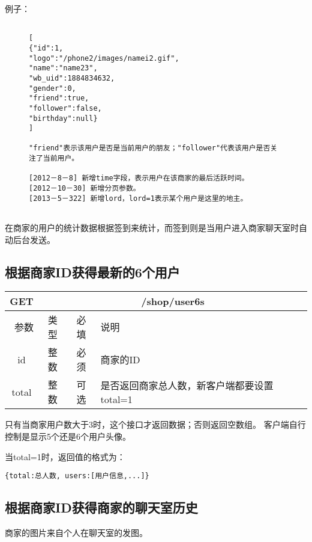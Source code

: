 \documentclass[cs4size]{ctexartutf8}
\begin{document}
例子：

\begin{figure}[H]
\begin{verbatim}

[
{"id":1,
"logo":"/phone2/images/namei2.gif",
"name":"name23",
"wb_uid":1884834632,
"gender":0,
"friend":true,
"follower":false,
"birthday":null}
]

"friend"表示该用户是否是当前用户的朋友；"follower"代表该用户是否关注了当前用户。

[2012－8－8] 新增time字段，表示用户在该商家的最后活跃时间。
[2012－10－30] 新增分页参数。
[2013－5－322] 新增lord，lord=1表示某个用户是这里的地主。


\end{verbatim}
\end{figure}

在商家的用户的统计数据根据签到来统计，而签到则是当用户进入商家聊天室时自动后台发送。



\subsection{根据商家ID获得最新的6个用户}

\begin{table}[H]
   \begin{center}
\begin{tabular}{|c|c|c|p{12cm}|}
\hline
GET & \multicolumn{3}{|c|}{/shop/user6s} \\
\hline\hline
 \  参数  & 类型 & 必填 &  说明  \\
\hline
 id  & 整数 & 必须 & 商家的ID\\
 \hline
 total  & 整数 & 可选 & 是否返回商家总人数，新客户端都要设置total=1\\
\hline
\end{tabular}
   \end{center}
\end{table}
只有当商家用户数大于3时，这个接口才返回数据；否则返回空数组。
客户端自行控制是显示5个还是6个用户头像。

当total=1时，返回值的格式为：
\begin{verbatim}
{total:总人数, users:[用户信息,...]}
\end{verbatim}


\subsection{根据商家ID获得商家的聊天室历史}
商家的图片来自个人在聊天室的发图。\label{photowall}
\end{document}
